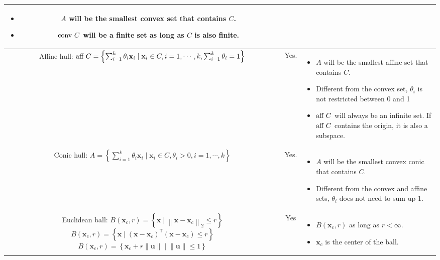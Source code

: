 \documentclass{article}
\newcommand{\trans}{\mathsf{T}}
\newcommand\norm[1]{\left\lVert#1\right\rVert}
\begin{document}
\begin{landscape}
\begin{table}
\begin{tabular}{|c|c|p{7cm}|}
\begin{itemize}[leftmargin=*]
            \item $A$ will be the smallest convex set that contains $C$.
            \item $\textnormal{conv } C$ will be a finite set as long as $C$ is also finite.
        \end{itemize} \\
        \hline
        \makecell{Affine hull: \\ $\textnormal{aff } C = \left\{ \sum_{i=1}^{k} \theta_i\mathbf{x}_i \mid \mathbf{x}_i \in C, i=1,\cdots, k, \sum_{i=1}^{k} \theta_i = 1  \right\}$} & Yes. & \begin{itemize}[leftmargin=*]
            \item $A$ will be the smallest affine set that contains $C$.
            \item Different from the convex set, \(\theta_i\) is not restricted between 0 and 1
            \item $\textnormal{aff } C$ will always be an infinite set. If $\textnormal{aff } C$ contains the origin, it is also a subspace.
        \end{itemize}\\
        \hline
        \makecell{Conic hull: \\ $A = \left\{ \sum_{i=1}^{k} \theta_i\mathbf{x}_i \mid \mathbf{x}_i \in C, \theta_i > 0, i=1,\cdots, k \right\}$} & Yes. & \begin{itemize}[leftmargin=*]
            \item $A$ will be the smallest convex conic that contains $C$.
            \item Different from the convex and affine sets, \(\theta_i\) does not need to sum up 1.
        \end{itemize} \\
        \hline
        \makecell{Euclidean ball: \\ \(B(\mathbf{x}_c, r) = \left\{ \mathbf{x} \mid \norm{\mathbf{x}-\mathbf{x}_c}_2 \leq r \right\}\) \\ \(B(\mathbf{x}_c, r) = \left\{ \mathbf{x} \mid \left( \mathbf{x}-\mathbf{x}_c \right)^\trans \left( \mathbf{x}-\mathbf{x}_c \right) \leq r \right\}\) \\ \(B(\mathbf{x}_c, r) = \left\{ \mathbf{x}_c + r \norm{\mathbf{u}} \mid \norm{\mathbf{u}} \leq 1 \right\}\)} & Yes & \begin{itemize}[leftmargin=*]
            \item \(B(\mathbf{x}_c, r)\) as long as \(r < \infty\).
            \item \(\mathbf{x}_c\) is the center of the ball.

\end{itemize}
\end{tabular}
\end{table}
\end{landscape}
\end{document}
